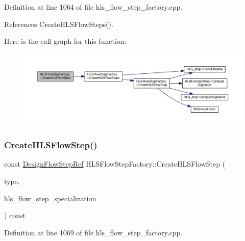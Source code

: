 Definition at line 1064 of file hls\+\_\+flow\+\_\+step\+\_\+factory.\+cpp.



References Create\+H\+L\+S\+Flow\+Steps().

Here is the call graph for this function\+:
\nopagebreak
\begin{figure}[H]
\begin{center}
\leavevmode
\includegraphics[width=350pt]{dd/d39/classHLSFlowStepFactory_a6f112350282f875b5ffef9050bd16dde_cgraph}
\end{center}
\end{figure}
\mbox{\label{classHLSFlowStepFactory_a2a56c258177069c03018a8c4bb5f487b}} 
\subsubsection{\texorpdfstring{Create\+H\+L\+S\+Flow\+Step()}{CreateHLSFlowStep()}\hspace{0.1cm}{\footnotesize\ttfamily [3/3]}}
{\footnotesize\ttfamily const \hyperlink{design__flow__step_8hpp_a9dd6b4474ddf52d41a78b1aaa12ae6c8}{Design\+Flow\+Step\+Ref} H\+L\+S\+Flow\+Step\+Factory\+::\+Create\+H\+L\+S\+Flow\+Step (\begin{DoxyParamCaption}\item[{const \hyperlink{hls__step_8hpp_ada16bc22905016180e26fc7e39537f8d}{H\+L\+S\+Flow\+Step\+\_\+\+Type}}]{type,  }\item[{const \hyperlink{hls__step_8hpp_a5fdd2edf290c196531d21d68e13f0e74}{H\+L\+S\+Flow\+Step\+Specialization\+Const\+Ref}}]{hls\+\_\+flow\+\_\+step\+\_\+specialization }\end{DoxyParamCaption}) const}



Definition at line 1069 of file hls\+\_\+flow\+\_\+step\+\_\+factory.\+cpp.



